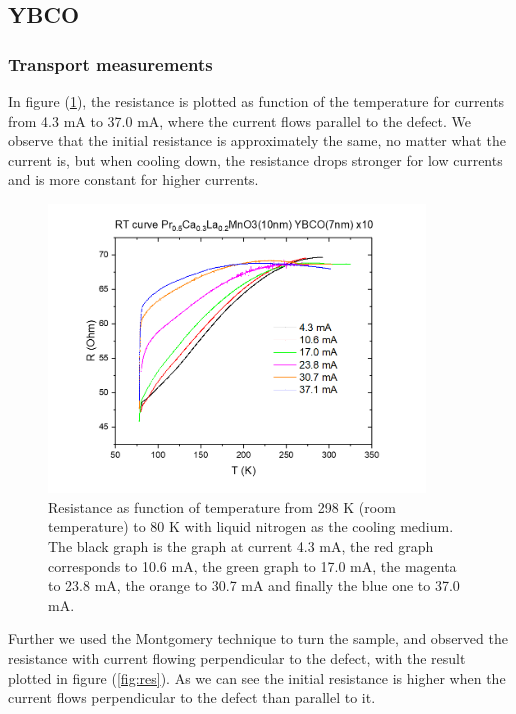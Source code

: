\documentclass{comjnl}
\begin{document}
\subsection{YBCO}
\subsubsection{Transport measurements}
In figure (\ref{fig:res_norm}), the resistance is plotted as function of the temperature for currents from 4.3 mA to 37.0 mA, where the current flows parallel to the defect. We observe that the initial resistance is approximately the same, no matter what the current is, but when cooling down, the resistance drops stronger for low currents and is more constant for higher currents. 
\begin{figure}[h]
\centering
\includegraphics[width=100mm]{Bilde1.png}
\caption{Resistance as function of temperature from 298 K (room temperature) to 80 K with liquid nitrogen as the cooling medium. The black graph is the graph at current 4.3 mA, the red graph corresponds to 10.6 mA, the green graph to 17.0 mA, the magenta to 23.8 mA, the orange to 30.7 mA and finally the blue one to 37.0 mA. \label{fig:res_norm}}
\end{figure}
Further we used the Montgomery technique to turn the sample, and observed the resistance with current flowing perpendicular to the defect, with the result plotted in figure (\ref{fig:res}). As we can see the initial resistance is higher when the current flows perpendicular to the defect than parallel to it. 
\end{document}
